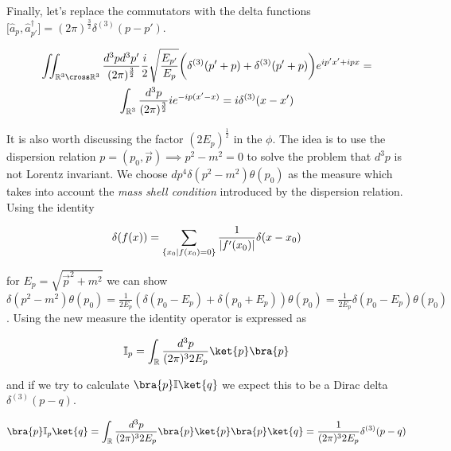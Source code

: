 Finally, let's replace the commutators with the delta functions $\big[\hat{a}_{p}, \hat{a}^{\dagger}_{p'} \big] = (2 \pi)^{\frac{3}{2}}
\delta^{(3)}(p - p')$.

\begin{equation*}
    \begin{gathered}
        \iint_{\mathbb{R}^{3} \cross \mathbb{R}^{3}} \frac{d^{3}p d^{3}p'}{(2 \pi)^{\frac{3}{2}}} \frac{i}{2} \sqrt{\frac{E_{p'}}{E_{p}}}
        \bigg( \delta^{(3)}(p' + p) + \delta^{(3)}(p' + p) \bigg) e^{i p' x' + i p x} = \\
        \int_{\mathbb{R}^{3}} \frac{d^{3}p}{(2 \pi)^{\frac{3}{2}}} i e^{- i p(x' - x)} = i \delta^{(3)}(x - x') \\
    \end{gathered}
\end{equation*}

It is also worth discussing the factor $(2 E_{p})^{\frac{1}{2}}$ in the $\phi$. The idea is
to use the dispersion relation $p = (p_{0}, \vec{p}) \implies p^{2} - m^2 = 0$ to solve the problem that $d^{3}p$ is
not Lorentz invariant. We choose $dp^{4} \delta(p^{2} - m^2) \theta(p_{0})$ as the measure which takes into account 
the \textit{mass shell condition} introduced by the dispersion relation. Using the identity

\begin{equation*}
    \delta(f(x)) = \sum_{\{x_{0} \\ | \\ f(x_{0}) = 0\}} \frac{1}{|f'(x_{0})|} \delta(x - x_{0})
\end{equation*}

for $E_{p} = \sqrt{\vec{p}^{2} + m^{2}}$ we can show $\delta(p^{2} - m^2) \theta(p_{0}) = \frac{1}{2 E_{p}} (\delta(p_{0} - E_{p}) + 
\delta(p_{0} + E_{p})) \theta(p_{0}) = \frac{1}{2 E_{p}} \delta(p_{0} - E_{p}) \theta(p_{0})$. Using the new measure the identity
operator is expressed as 

\begin{equation*}
    \mathbb{I}_{p} = \int_{\mathbb{R}} \frac{d^{3}p}{(2 \pi)^{3} 2 E_{p}} \ket{p} \bra{p}
\end{equation*}

and if we try to calculate $\bra{p} \mathbb{I} \ket{q}$ we expect this to be a Dirac delta $\delta^{(3)}(p - q)$.

\begin{equation*}
    \bra{p} \mathbb{I}_{p} \ket{q} = \int_{\mathbb{R}} \frac{d^{3}p}{(2 \pi)^{3} 2 E_{p}} \bra{p} \ket{p} \bra{p}\ket{q} = \frac{1}{(2 \pi)^{3} 2 E_{p}} \delta^{(3)}(p - q)
\end{equation*}

